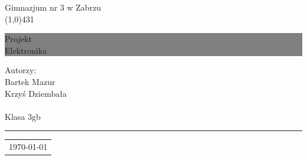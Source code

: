 \documentclass[a4paper,12pt, twoside]{article}
\newcommand{\HRule}[1]{\hfill \rule{0.2\linewidth}{#1}} %
\begin{document}

\begin{titlepage}
\small Gimnazjum nr 3 w Zabrzu\\
\line(1,0){431}\\
\colorbox{grey}{
	\parbox[t]{1.0\linewidth}{
		\centering \fontsize{50pt}{80pt}\selectfont %
		\vspace*{0.7cm} %
		
		\hfill Projekt \\
		\hfill Elektronika \\

		\vspace*{0.7cm} %
	}
}

\vfill %


{\centering \large 
\hfill Autorzy: \\
\hfill Bartek Mazur \\
\hfill Krzyś Dziembała \\
\hfill \\
\hfill Klasa 3gb\\

\HRule{1pt}} %


\begin{tabular}{r}
\small\today
\end{tabular}
\hfill
\clearpage %

\end{titlepage}
\newpage\null\thispagestyle{empty}\newpage
\end{document}
